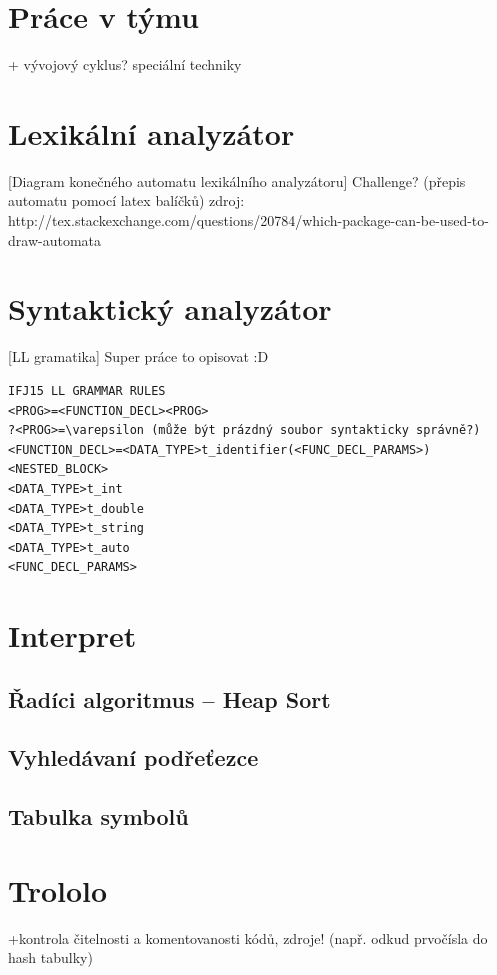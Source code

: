 \documentclass[a4paper, 12pt]{article}
\begin{document}
\tableofcontents
\newpage
\section{Práce v týmu}
+ vývojový cyklus? speciální techniky
\section{Lexikální analyzátor} \label{lexer}
[Diagram konečného automatu lexikálního analyzátoru]
Challenge? (přepis automatu pomocí latex balíčků)
zdroj: http://tex.stackexchange.com/questions/20784/which-package-can-be-used-to-draw-automata

\section{Syntaktický analyzátor} \label{parser}
[LL gramatika]
Super práce to opisovat :D
\begin{verbatim}
IFJ15 LL GRAMMAR RULES
<PROG>=<FUNCTION_DECL><PROG>
?<PROG>=\varepsilon (může být prázdný soubor syntakticky správně?)
<FUNCTION_DECL>=<DATA_TYPE>t_identifier(<FUNC_DECL_PARAMS>)<NESTED_BLOCK>
<DATA_TYPE>t_int
<DATA_TYPE>t_double
<DATA_TYPE>t_string
<DATA_TYPE>t_auto
<FUNC_DECL_PARAMS>
\end{verbatim}
\section{Interpret} \label{interpret}

\subsection{Řadíci algoritmus -- Heap Sort}
\subsection{Vyhledávaní podřeťezce}
\subsection{Tabulka symbolů}

\section{Trololo} \label{trololo}
+kontrola čitelnosti a komentovanosti kódů, zdroje! (např. odkud prvočísla do hash tabulky)
\end{document}
